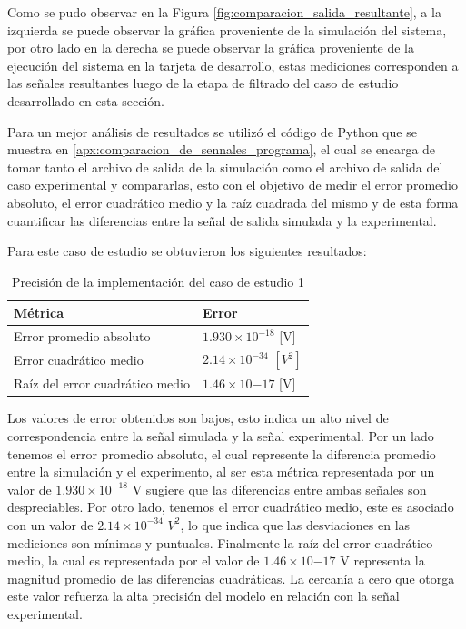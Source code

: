 Como se pudo observar en la Figura \ref{fig:comparacion_salida_resultante}, a la izquierda se puede observar la gráfica proveniente de la simulación del sistema, por otro lado en la derecha se puede observar la gráfica proveniente de la ejecución del sistema en la tarjeta de desarrollo, estas mediciones corresponden a las señales resultantes luego de la etapa de filtrado del caso de estudio desarrollado en esta sección. 

Para un mejor análisis de resultados se utilizó el código de Python que se muestra en \ref{apx:comparacion_de_sennales_programa}, el cual se encarga de tomar tanto el archivo de salida de la simulación como el archivo de salida del caso experimental y compararlas, esto con el objetivo de  medir el error promedio absoluto, el error cuadrático medio y la raíz cuadrada del mismo y de esta forma  cuantificar las diferencias entre la señal de salida simulada y la experimental.

Para este caso de estudio se obtuvieron los siguientes resultados:

\begin{table}[htbp!]
    \centering
    \caption{Precisión de la implementación del caso de estudio 1}
    \label{tab:filter-error}
    \begin{tabular}{ll}
    Métrica                       & Error \\ \hline
    Error promedio absoluto         &   $1.930 \times 10^{-18}$ [V]    \\
    Error cuadrático medio          &   $2.14 \times 10^{-34}$ $[V^{2}]$    \\
    Raíz del error cuadrático medio &   $1.46 \times 10{-17}$ [V]  
    \end{tabular}
    \end{table}


Los valores de error obtenidos son bajos, esto indica un alto nivel de correspondencia entre la señal simulada y la señal experimental. Por un lado tenemos el error promedio absoluto, el cual represente la diferencia promedio entre la simulación y el experimento, al ser esta métrica representada por un valor de $1.930 \times 10^{-18}$ V sugiere que las diferencias entre ambas señales son despreciables. Por otro lado, tenemos el error cuadrático medio, este es asociado con un valor de $2.14 \times 10^{-34}$ $V^{2}$, lo que indica que las desviaciones en las mediciones son mínimas y puntuales. Finalmente la raíz del error cuadrático medio, la cual es representada por el valor de $1.46 \times 10{-17}$ V representa la magnitud promedio de las diferencias cuadráticas. La cercanía a cero que otorga este valor refuerza la alta precisión del modelo en relación con la señal experimental.

